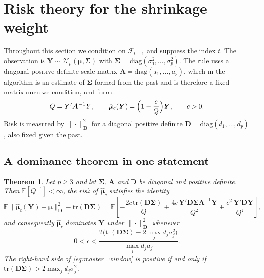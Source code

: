 \documentclass[pdflatex,sn-mathphys-num]{sn-jnl}%
\theoremstyle{thmstyleone}%
\newtheorem{theorem}{Theorem}%
\theoremstyle{thmstyletwo}%
\theoremstyle{thmstylethree}%
\newcommand{\tr}{\mathrm{tr}}
\newcommand{\diag}{\mathrm{diag}}
\newcommand{\E}{\mathbb{E}}
\begin{document}
\section{Risk theory for the shrinkage weight}
\label{sec:risk}

Throughout this section we condition on $\mathcal F_{t-1}$ and suppress the index $t$. The observation is $\bm Y\sim\mathcal N_p(\bm\mu,\bm\Sigma)$ with $\bm\Sigma=\diag(\sigma^2_1,\dots,\sigma^2_p)$. The rule uses a diagonal positive definite scale matrix $\bm A=\diag(a_1,\dots,a_p)$, which in the algorithm is an estimate of $\bm\Sigma$ formed from the past and is therefore a fixed matrix once we condition, and forms
\begin{equation}
\label{eq:Q_and_delta}
Q=\bm Y'\bm A^{-1}\bm Y,
\qquad
\hat{\bm\mu}_c(\bm Y)=\Bigl(1-\frac{c}{Q}\Bigr)\bm Y ,
\qquad c>0 .
\end{equation}
Risk is measured by $\|\cdot\|^2_{\bm D}$ for a diagonal positive definite $\bm D=\diag(d_1,\dots,d_p)$, also fixed given the past.

\subsection{A dominance theorem in one statement}

\begin{theorem}
\label{thm:master}
Let $p\ge3$ and let $\bm\Sigma$, $\bm A$ and $\bm D$ be diagonal and positive definite. Then $\E[Q^{-1}]<\infty$, the risk of $\hat{\bm\mu}_c$ satisfies the identity
\begin{equation}
\label{eq:master_identity}
\E\bigl\|\hat{\bm\mu}_c(\bm Y)-\bm\mu\bigr\|^2_{\bm D}
-\tr(\bm D\bm\Sigma)
=
\E\left[
-\frac{2c\,\tr(\bm D\bm\Sigma)}{Q}
+\frac{4c\,\bm Y'\bm D\bm\Sigma\bm A^{-1}\bm Y}{Q^{2}}
+\frac{c^{2}\,\bm Y'\bm D\bm Y}{Q^{2}}
\right],
\end{equation}
and consequently $\hat{\bm\mu}_c$ dominates $\bm Y$ under $\|\cdot\|^2_{\bm D}$ whenever
\begin{equation}
\label{eq:master_window}
0<c<\frac{2\bigl(\tr(\bm D\bm\Sigma)-2\max_{j}d_j\sigma^2_j\bigr)}{\max_{j}d_ja_j} .
\end{equation}
The right-hand side of \eqref{eq:master_window} is positive if and only if $\tr(\bm D\bm\Sigma)>2\max_{j}d_j\sigma^2_j$.
\end{theorem}
\end{document}
